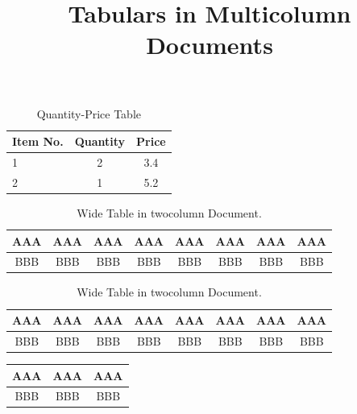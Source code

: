 \documentclass[twocolumn]{article}
\title{Tabulars in Multicolumn Documents}
\date{}
\begin{document}
	\maketitle
	\kant[1-3]
	
	\begin{table}[h]
		\centering
		\begin{tabular}{|l|c|c|}
			\hline
			Item No. & Quantity & Price \\
			\hline
			1		 & 2		& 3.4 	\\
			\hline
			2		 & 1		& 5.2	\\
			\hline 
		\end{tabular}
		\caption{Quantity-Price Table}
	\end{table}
	
	\begin{table}[t]
		\centering
		\begin{tabular}{|*{8}{c|}}
			\hline
			AAA&AAA&AAA&AAA&AAA&AAA&AAA&AAA \\
			\hline\hline
			BBB&BBB&BBB&BBB&BBB&BBB&BBB&BBB \\
			\hline
		\end{tabular}
		\caption{Wide Table in twocolumn Document.}
	\end{table}
	
	\begin{table}[b]
		\centering
		\begin{tabular}{|*{8}{c|}}
			\hline
			AAA&AAA&AAA&AAA&AAA&AAA&AAA&AAA \\
			\hline\hline
			BBB&BBB&BBB&BBB&BBB&BBB&BBB&BBB \\
			\hline
		\end{tabular}
		\caption{Wide Table in twocolumn Document.}
	\end{table}	
	
	\kant[1-7]
	
	\begin{table}
		\begin{tabular}{|*{3}{c|}}
			\hline
			AAA & AAA & AAA \\
			\hline\hline
			BBB & BBB & BBB \\
			\hline
		\end{tabular}
	\end{table}
	\kant[1]
	
\end{document}
